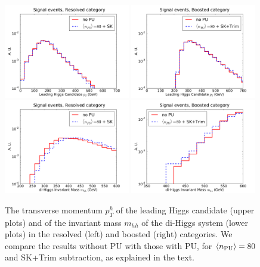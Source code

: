 \begin{figure}[t]
  \begin{center}
  \includegraphics[width=0.49\textwidth]{plots/pt_H0_C2_res_comp.pdf}
  \includegraphics[width=0.49\textwidth]{plots/pt_H0_C2_bst_comp.pdf}
  \includegraphics[width=0.49\textwidth]{plots/m_HH_C2_res_comp.pdf}
  \includegraphics[width=0.49\textwidth]{plots/m_HH_C2_bst_comp.pdf}
  \caption{\small
   The
   transverse momentum $p_T^h$ of the leading
    Higgs candidate (upper plots) and of the invariant mass $m_{hh}$
    of the di-Higgs system (lower plots) in the resolved
    (left) and boosted (right) categories.
    We compare the results without PU with those with PU,
    for $\left\langle n_{\rm PU}\right\rangle=80$ and SK+Trim subtraction,
    as explained in the text.
}
\label{fig:mHH_PU}
\end{center}
\end{figure}



